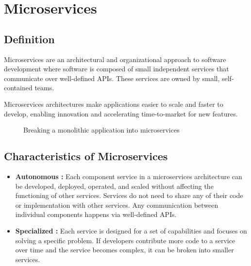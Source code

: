 \section{Microservices}

\subsection{Definition}
Microservices are an architectural and organizational approach to software development where software is composed of small independent services that communicate over well-defined APIs.
These services are owned by small, self-contained teams. \cite{microservices}

\medskip
Microservices architectures make applications easier to scale and faster to develop, enabling innovation and accelerating time-to-market for new features.
\begin{figure}[H]
    \centering
    \caption{Breaking a monolithic application into microservices}
    \label{fig:monolith-to-microservices}
\end{figure}
\subsection{Characteristics of Microservices}
\begin{itemize}
    \item \textbf{Autonomous :} Each component service in a microservices architecture can be developed, deployed, operated, and scaled without affecting the functioning of other services. Services do not need to share any of their code or implementation with other services. Any communication between individual components happens via well-defined APIs.
    \item \textbf{Specialized :} Each service is designed for a set of capabilities and focuses on solving a specific problem. If developers contribute more code to a service over time and the service becomes complex, it can be broken into smaller services.
\end{itemize}

